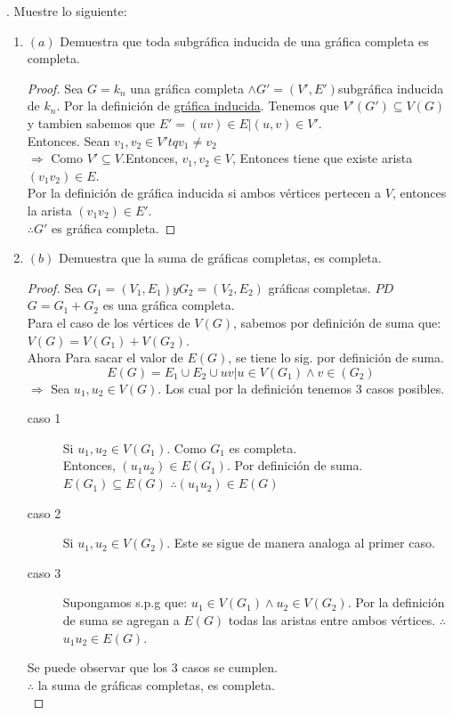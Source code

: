\documentclass{article}
\begin{document}
  . Muestre lo siguiente: %
  \begin{enumerate}
  \item $(a)$ Demuestra que toda subgráfica inducida de una gráfica completa es completa. \\
    \begin{proof}
      Sea $G = k_n$ una gráfica completa $\land G'=(V',E') $subgráfica inducida de $k_n $. Por la definición de \underline{gráfica inducida}.
      Tenemos que $V'(G') \subseteq V(G)$ y tambien sabemos que $E' = {(uv)\in E | (u,v)\in V'}$. \\

      Entonces. Sean $v_1,v_2 \in V' tq v_1 \neq v_2$ \\
      $\Longrightarrow$ Como $V' \subseteq V$.Entonces, $v_1,v_2 \in V$, Entonces tiene que existe arista $(v_1v_2)\in E$.\\
      Por la definición de gráfica inducida si ambos vértices pertecen a $V$, entonces la arista $(v_1v_2)\in E'$. \\
      $\therefore G'$ es gráfica completa.
    \end{proof}

  \item $(b)$ Demuestra que la suma de gráficas completas, es completa. \\
    \begin{proof}
      Sea $G_1 = (V_1,E_1) y G_2= (V_2,E_2) $ gráficas completas. \underline{$PD$} $G = G_1+G_2$ es una gráfica completa. \\
      Para el caso de los vértices de $V(G)$, sabemos por definición de suma que: $V(G) = V(G_1)+V(G_2)$.\\
      Ahora Para sacar el valor de $E(G)$, se tiene lo sig. por definición de suma. \\
      \begin{equation}
        E(G) = E_1 \cup E_2 \cup {uv | u\in V(G_1) \land v\in(G_2)}
      \end{equation}
      $\Longrightarrow$ Sea $u_1,u_2 \in V(G)$. Los cual por la definición tenemos 3 casos posibles.
      \begin{description}
      \item[caso 1] Si $u_1,u_2 \in V(G_1)$. Como $G_1$ es completa. \\Entonces, $(u_1u_2)\in E(G_1)$. Por definición de suma.
        $E(G_1) \subseteq E(G) $ $\therefore (u_1u_2)\in E(G)$ \\
      \item[caso 2] Si $u_1,u_2 \in V(G_2)$. Este se sigue de manera analoga al primer caso. \\
      \item[caso 3] Supongamos s.p.g que:  $u_1 \in V(G_1) \land u_2 \in V(G_2)$. Por la definición de suma se agregan a $E(G)$ todas las aristas
        entre ambos vértices. $\therefore$ $u_1u_2 \in E(G)$.\\ 
      \end{description}
      Se puede observar que los 3 casos se cumplen. \\
      $\therefore$ la suma de gráficas completas, es completa. \\


\end{proof}
\end{enumerate}
\end{document}
